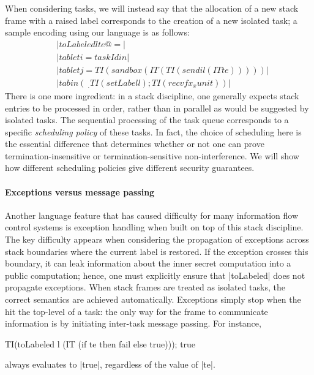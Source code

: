 When considering tasks, we will instead say that the allocation of a new
stack frame with a raised label corresponds to the creation of a new
isolated task; a sample encoding using our language is as follows:
\begin{align*}
    & |toLabeled l te @= | \\
    & |tab let i = taskId in| \\
    & |tab let j = TI (sandbox (IT (TI (send i l (IT te)))))| \\
    & |tab in (\ _ . TI (setLabel l); TI (recvf x _ x unit))|
\end{align*}
There is one more ingredient: in a stack discipline, one generally
expects stack entries to be processed in order, rather than in parallel
as would be suggested by isolated tasks.  The sequential processing of
the task queue corresponds to a specific \emph{scheduling policy} of
these tasks.  In fact, the choice of scheduling here is the essential difference that
determines whether or not one can prove termination-insensitive or
termination-sensitive non-interference. We will show how different
scheduling policies give different security guarantees.

\paragraph{Exceptions versus message passing}
Another language feature that has caused difficulty for
many information flow control systems is exception handling
when built on top of this stack discipline.
%
The key difficulty appears when considering the propagation of exceptions
across stack boundaries where the current label is restored.
%
If the exception crosses this boundary, it can leak information about the
inner secret computation into a public computation; hence, one must
explicitly ensure that |toLabeled| does not propagate exceptions.
%
When stack frames are treated as isolated tasks, the correct semantics
are achieved automatically.
%
Exceptions simply stop when the hit the top-level of a task:
the only way for the frame to communicate information is by
initiating inter-task message passing.
%
For instance,
\begin{code}
TI(toLabeled l (IT (if te then fail else true))); true
\end{code}
always evaluates to |true|, regardless of the value of |te|.

